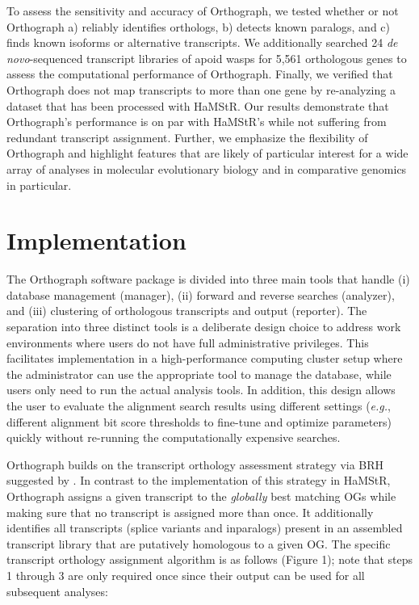 To assess the sensitivity and accuracy of Orthograph, we tested whether
or not Orthograph a) reliably identifies orthologs, b) detects known
paralogs, and c) finds known isoforms or alternative transcripts. We
additionally searched 24 \emph{de novo}-sequenced transcript libraries
of apoid wasps for 5,561 orthologous genes to assess the computational
performance of Orthograph. Finally, we verified that Orthograph does not
map transcripts to more than one gene by re-analyzing a dataset that has
been processed with HaMStR. Our results demonstrate that Orthograph's
performance is on par with HaMStR's while not suffering from redundant
transcript assignment. Further, we emphasize the flexibility of
Orthograph and highlight features that are likely of particular interest
for a wide array of analyses in molecular evolutionary biology and in
comparative genomics in particular.

\section{Implementation}\label{implementation}

The Orthograph software package is divided into three main tools that
handle (i) database management (manager), (ii) forward and reverse
searches (analyzer), and (iii) clustering of orthologous transcripts and
output (reporter). The separation into three distinct tools is a
deliberate design choice to address work environments where users do not
have full administrative privileges. This facilitates implementation in
a high-performance computing cluster setup where the administrator can
use the appropriate tool to manage the database, while users only need
to run the actual analysis tools. In addition, this design allows the
user to evaluate the alignment search results using different settings
(\emph{e.g.}, different alignment bit score thresholds to fine-tune and
optimize parameters) quickly without re-running the computationally
expensive searches.

Orthograph builds on the transcript orthology assessment strategy via
BRH suggested by \cite{Ebersberger2009}. In contrast to the
implementation of this strategy in HaMStR, Orthograph assigns a given
transcript to the \emph{globally} best matching OGs while making sure
that no transcript is assigned more than once. It additionally
identifies all transcripts (splice variants and inparalogs) present in
an assembled transcript library that are putatively homologous to a
given OG. The specific transcript orthology assignment algorithm is as
follows (Figure 1); note that steps 1 through 3 are only required once
since their output can be used for all subsequent analyses:


